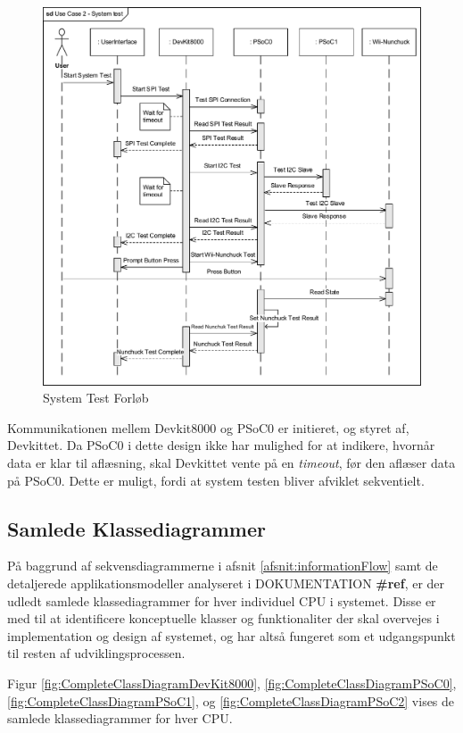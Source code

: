 \begin{figure}[H]
	\centering
	\includegraphics[width=\textwidth] {Systemarkitektur/images/SequenceDiagramUC2}
	\caption{System Test Forløb}
	\label{fig:SystemTestSekvensDiagram}
\end{figure}

Kommunikationen mellem Devkit8000 og PSoC0 er initieret, og styret af, Devkittet. Da PSoC0 i dette design ikke har mulighed for at indikere, hvornår data er klar til aflæsning, skal Devkittet vente på en \textit{timeout}, før den aflæser data på PSoC0. Dette er muligt, fordi at system testen bliver afviklet sekventielt.

\subsection{Samlede Klassediagrammer}
På baggrund af sekvensdiagrammerne i afsnit \ref{afsnit:informationFlow} samt de detaljerede applikationsmodeller analyseret i DOKUMENTATION \textbf{\#ref}, er der udledt samlede klassediagrammer for hver individuel CPU i systemet. Disse er med til at identificere konceptuelle klasser og funktionaliter der skal overvejes i implementation og design af systemet, og har altså fungeret som et udgangspunkt til resten af udviklingsprocessen.

Figur \ref{fig:CompleteClassDiagramDevKit8000}, \ref{fig:CompleteClassDiagramPSoC0}, \ref{fig:CompleteClassDiagramPSoC1}, og \ref{fig:CompleteClassDiagramPSoC2} vises de samlede klassediagrammer for hver CPU.

